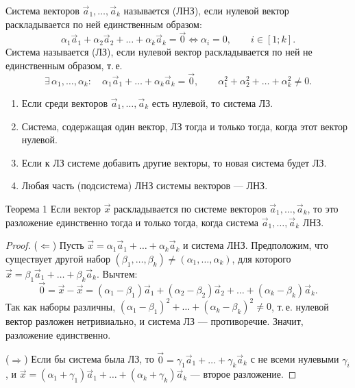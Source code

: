 \documentclass[11pt,a4paper]{article}
\begin{document}
\begin{opr}
Система векторов $\vec a_1,\dots,\vec a_k$ называется  (ЛНЗ), если нулевой вектор раскладывается
по ней единственным образом:
\[
\alpha_1\vec a_1+\alpha_2\vec a_2+\dots+\alpha_k\vec a_k=\vec 0\iff\alpha_i=0,\qquad i\in[1;k].
\]
Система называется  (ЛЗ), если нулевой вектор раскладывается по ней не единственным образом, т.\,е.
\[
\exists\,\alpha_1,\dots,\alpha_k:\quad\alpha_1\vec a_1+\dots+\alpha_k\vec a_k=\vec 0,\qquad\alpha_1^2+\alpha_2^2+\dots+\alpha_k^2\ne0.
\]
\end{opr}

\begin{svv}
\begin{enumerate}
\item Если среди векторов $\vec a_1,\dots,\vec a_k$ есть нулевой, то система ЛЗ.
\item Система, содержащая один вектор, ЛЗ тогда и только тогда, когда этот вектор нулевой.
\item Если к ЛЗ системе добавить другие векторы, то новая система будет ЛЗ.
\item Любая часть (подсистема) ЛНЗ системы векторов — ЛНЗ.
\end{enumerate}
\end{svv}

\begin{kob}{Теорема 1}
Если вектор $\vec x$ раскладывается по системе векторов $\vec a_1,\dots,\vec a_k$, то это разложение единственно тогда
и только тогда, когда система $\vec a_1,\dots,\vec a_k$ ЛНЗ.
\end{kob}

\begin{proof}
($\Leftarrow$) Пусть $\vec x=\alpha_1\vec a_1+\dots+\alpha_k\vec a_k$ и система ЛНЗ. Предположим, что существует другой набор
$(\beta_1,\dots,\beta_k)\ne(\alpha_1,\dots,\alpha_k)$, для которого $\vec x=\beta_1\vec a_1+\dots+\beta_k\vec a_k$. Вычтем:
\[
\vec 0=\vec x-\vec x=(\alpha_1-\beta_1)\vec a_1+(\alpha_2-\beta_2)\vec a_2+\dots+(\alpha_k-\beta_k)\vec a_k.
\]
Так как наборы различны, $(\alpha_1-\beta_1)^2+\dots+(\alpha_k-\beta_k)^2\ne0$, т.\,е. нулевой вектор разложен нетривиально,
и система ЛЗ — противоречие. Значит, разложение единственно.

($\Rightarrow$) Если бы система была ЛЗ, то $\vec 0=\gamma_1\vec a_1+\dots+\gamma_k\vec a_k$ с не всеми нулевыми $\gamma_i$, и
$\vec x=(\alpha_1+\gamma_1)\vec a_1+\dots+(\alpha_k+\gamma_k)\vec a_k$ — второе разложение.
\end{proof}
\end{document}
